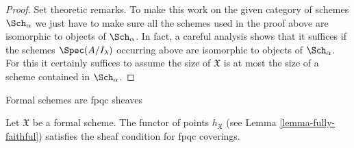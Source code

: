 \begin{proof}
\medskip\noindent
Set theoretic remarks. To make this work on the given category
of schemes $\Sch_\alpha$ we just have to make sure all the
schemes used in the proof above are isomorphic to objects of $\Sch_\alpha$.
In fact, a careful analysis shows that it suffices if the
schemes $\Spec(A/I_\lambda)$ occurring above are isomorphic to
objects of $\Sch_\alpha$. For this it certainly suffices to assume
the size of $\mathfrak X$ is at most the size of
a scheme contained in $\Sch_\alpha$.
\end{proof}

\begin{lemma}
\label{lemma-formal-scheme-sheaf-fppf}
\begin{slogan}
Formal schemes are fpqc sheaves
\end{slogan}
Let $\mathfrak X$ be a formal scheme. The functor of points
$h_\mathfrak X$ (see Lemma \ref{lemma-fully-faithful})
satisfies the sheaf condition for fpqc coverings.
\end{lemma}

